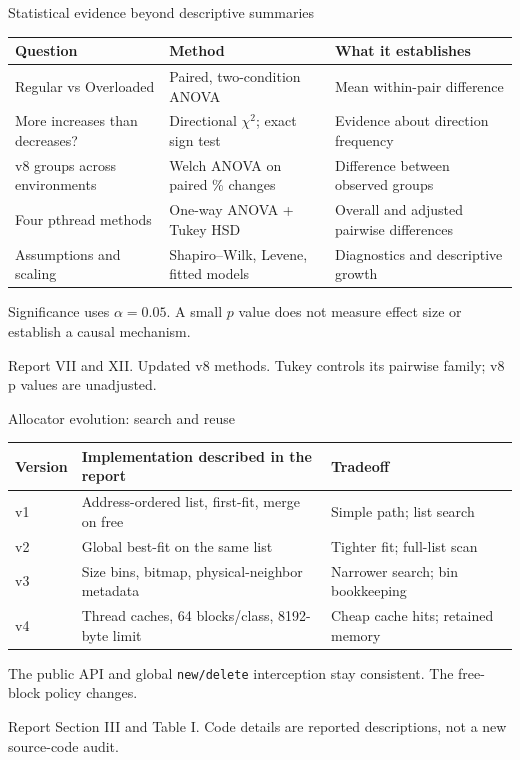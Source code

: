 \documentclass[aspectratio=169,11pt]{beamer}
\newcommand{\source}[1]{\par\vfill{\tiny\color{gray}#1\par}}
\begin{document}
\begin{frame}{Statistical evidence beyond descriptive summaries}
\small\centering
\begin{tabular}{p{}p{}p{}}\toprule
Question & Method & What it establishes\\\midrule
Regular vs Overloaded & Paired, two-condition ANOVA & Mean within-pair difference\\
More increases than decreases? & Directional $\chi^2$; exact sign test & Evidence about direction frequency\\
v8 groups across environments & Welch ANOVA on paired \% changes & Difference between observed groups\\
Four pthread methods & One-way ANOVA + Tukey HSD & Overall and adjusted pairwise differences\\
Assumptions and scaling & Shapiro--Wilk, Levene, fitted models & Diagnostics and descriptive growth\\
\bottomrule\end{tabular}\par
\medskip\raggedright\normalsize Significance uses $\alpha=0.05$. A small $p$ value does not measure effect size or establish a causal mechanism.
\source{Report VII and XII. Updated v8 methods. Tukey controls its pairwise family; v8 p values are unadjusted.}
\end{frame}


\begin{frame}{Allocator evolution: search and reuse}
\small\centering
\begin{tabular}{p{}p{}p{}}\toprule
Version & Implementation described in the report & Tradeoff\\\midrule
v1 & Address-ordered list, first-fit, merge on free & Simple path; list search\\
v2 & Global best-fit on the same list & Tighter fit; full-list scan\\
v3 & Size bins, bitmap, physical-neighbor metadata & Narrower search; bin bookkeeping\\
v4 & Thread caches, 64 blocks/class, 8192-byte limit & Cheap cache hits; retained memory\\
\bottomrule\end{tabular}\par
\medskip\raggedright\normalsize The public API and global \texttt{new/delete} interception stay consistent. The free-block policy changes.
\source{Report Section III and Table I. Code details are reported descriptions, not a new source-code audit.}
\end{frame}
\end{document}
